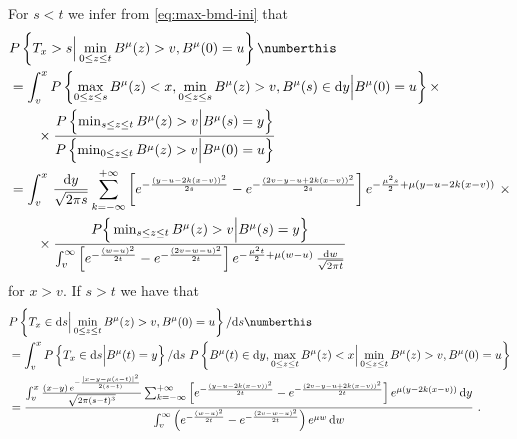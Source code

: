 %
For $ s <  t $ we infer  from \eqref{eq:max-bmd-ini}  that 
%
%
\begin{align*}
	&
	P\left\{ T_x > s \Big| \min_{ 0 \leq z \leq t }B^\mu( z) > v, B^\mu(0) = u \right\} 
	\numberthis \label{eq:first-psg-dist}
	\\
	&=
	\int_v^x P\left\{ \max_{ 0 \leq z \leq s }B^\mu( z) < x, \min_{ 0 \leq z \leq s }B^\mu( z) > v , 
	B^\mu ( s ) \in \mathrm d y  \Big | B^\mu ( 0) = u \right\}	\times 
	\\
	& \qquad \times 
	\frac{
		P\left\{  \min_{ s \leq z \leq t }B^\mu( z) > v \Big | B^\mu ( s) = y \right\}			
	}{
		P\left\{  \min_{ 0 \leq z \leq t }B^\mu( z) > v \Big | B^\mu ( 0) = u \right\}
	}
	\\
	&=
	\int_v^x \, \frac{\mathrm d y}{\sqrt{2 \pi s}} \sum_{k = - \infty}^{+\infty}
	\left[ 
	e^{    -   \frac{(y - u - 2k(x-v))^2}{2s} } 
	- 
	e^{    -   \frac{(2v - y - u +2k(x-v))^2}{2s} }  
	\right ] 
	e^{ - \frac{\mu^2s}{2} + \mu ( y - u - 2k(x-v))} 
	\,\,\times 
	\\
	& \qquad \times 
	\frac{
		P\Big\{   \min_{s \leq z \leq t} B^\mu(z)   > v  \Big | B^\mu ( s) = y \Big\}
	}{
		\int_v^\infty 
		\left[ 
		e^{  - \frac{(w-u)^2}{2t}  } 
		- 
		e^{  - \frac{(2v - w-u)^2}{2t}  } 
		\right]
		e^{  - \frac{\mu^2 t}{2} + \mu ( w - u)   } \, \frac{ \mathrm d w}{\sqrt{2 \pi t} } 
	}
\end{align*}
for $ x > v$. If $ s > t $ we have that
\begin{align*}
&
	P\left\{ T_x \in \mathrm d s \Big| \min_{ 0 \leq z \leq t }B^\mu( z) > v, B^\mu(0) = u \right\} 
	/ \mathrm d s
	\numberthis \label{eq:first-psg-dist-ts}
	\\
	&=
	\int_v^x 
	P\left\{ T_x\in \mathrm d s \Big| B^\mu(t) = y \right\} / \mathrm d s
	\,\,
	P\left\{  
	B^\mu(t) \in \mathrm d y, \max_{0 \leq z \leq t} B^\mu (z) < x \Big| \min_{ 0 \leq z \leq t } B^\mu(z) > v , B^\mu(0) = u
	\right\}
	\\
	&=
	\frac{
		\int_v^x
		\frac{ (x-y)\, e^{ - \frac{  |x- y - \mu (s-t)|^2} {2(s-t)} } }
		{\sqrt{2 \pi (s-t)^3} } 
		\sum_{k = - \infty}^{+\infty}
		\left[ 
		e^{    -   \frac{(y - u - 2k(x-v))^2}{2t} } 
		- 
		e^{    -   \frac{(2v - y - u +2k(x-v))^2}{2t} }  
		\right ] 
			e^{  \mu ( y  - 2k(x-v))}
		 \, \mathrm d y}
	{\int_v^\infty \left(  e^{- \frac{(w - u)^2}{2t}} -  e^{- \frac{(2v - w - u)^2}{2t}}  \right)
	e^{\mu w} \, \mathrm d w 
	} \,\, .
\end{align*}
%
